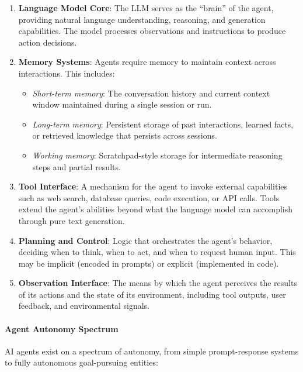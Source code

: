 \documentclass[a4paper,twoside]{sapthesis}
\begin{document}
\begin{enumerate}
    \item \textbf{Language Model Core}: The LLM serves as the ``brain'' of the agent, providing natural language understanding, reasoning, and generation capabilities. The model processes observations and instructions to produce action decisions.
    
    \item \textbf{Memory Systems}: Agents require memory to maintain context across interactions. This includes:
    \begin{itemize}
        \item \emph{Short-term memory}: The conversation history and current context window maintained during a single session or run.
        \item \emph{Long-term memory}: Persistent storage of past interactions, learned facts, or retrieved knowledge that persists across sessions.
        \item \emph{Working memory}: Scratchpad-style storage for intermediate reasoning steps and partial results.
    \end{itemize}
    
    \item \textbf{Tool Interface}: A mechanism for the agent to invoke external capabilities such as web search, database queries, code execution, or API calls. Tools extend the agent's abilities beyond what the language model can accomplish through pure text generation.
    
    \item \textbf{Planning and Control}: Logic that orchestrates the agent's behavior, deciding when to think, when to act, and when to request human input. This may be implicit (encoded in prompts) or explicit (implemented in code).
    
    \item \textbf{Observation Interface}: The means by which the agent perceives the results of its actions and the state of its environment, including tool outputs, user feedback, and environmental signals.
\end{enumerate}

\paragraph{Agent Autonomy Spectrum}
AI agents exist on a spectrum of autonomy, from simple prompt-response systems to fully autonomous goal-pursuing entities:
\end{document}
